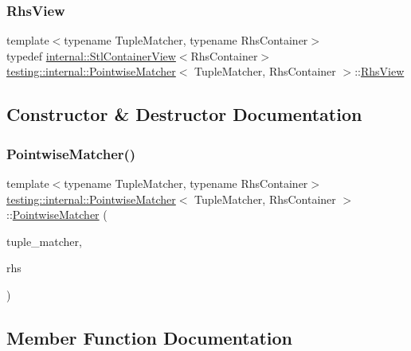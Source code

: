 \subsubsection{\texorpdfstring{Rhs\+View}{RhsView}}
{\footnotesize\ttfamily template$<$typename Tuple\+Matcher, typename Rhs\+Container$>$ \\
typedef \hyperlink{classtesting_1_1internal_1_1_stl_container_view}{internal\+::\+Stl\+Container\+View}$<$Rhs\+Container$>$ \hyperlink{classtesting_1_1internal_1_1_pointwise_matcher}{testing\+::internal\+::\+Pointwise\+Matcher}$<$ Tuple\+Matcher, Rhs\+Container $>$\+::\hyperlink{classtesting_1_1internal_1_1_pointwise_matcher_a215d397bfaf0f8bc948cb7b5ff9100c9}{Rhs\+View}}



\subsection{Constructor \& Destructor Documentation}
\mbox{\label{classtesting_1_1internal_1_1_pointwise_matcher_aa6e63218a93062d5055428462417821f}} 
\subsubsection{\texorpdfstring{Pointwise\+Matcher()}{PointwiseMatcher()}}
{\footnotesize\ttfamily template$<$typename Tuple\+Matcher, typename Rhs\+Container$>$ \\
\hyperlink{classtesting_1_1internal_1_1_pointwise_matcher}{testing\+::internal\+::\+Pointwise\+Matcher}$<$ Tuple\+Matcher, Rhs\+Container $>$\+::\hyperlink{classtesting_1_1internal_1_1_pointwise_matcher}{Pointwise\+Matcher} (\begin{DoxyParamCaption}\item[{const Tuple\+Matcher \&}]{tuple\+\_\+matcher,  }\item[{const Rhs\+Container \&}]{rhs }\end{DoxyParamCaption})\hspace{0.3cm}{\ttfamily [inline]}}



\subsection{Member Function Documentation}
\mbox{\label{classtesting_1_1internal_1_1_pointwise_matcher_a50b68745b7fea83ab076b22fa0497e7d}} 

